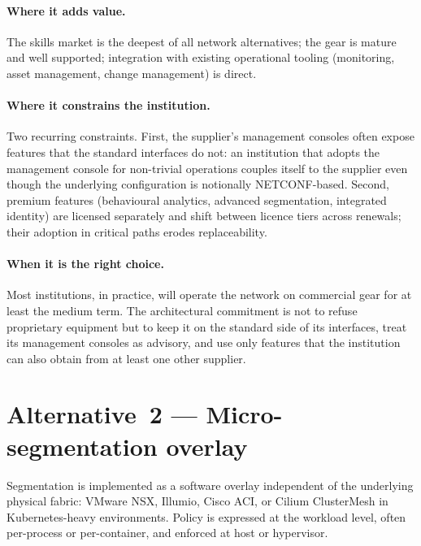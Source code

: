 \paragraph{Where it adds value.} The skills market is the deepest of
all network alternatives; the gear is mature and well supported;
integration with existing operational tooling (monitoring, asset
management, change management) is direct.

\paragraph{Where it constrains the institution.} Two recurring
constraints. First, the supplier's management consoles often expose
features that the standard interfaces do not: an institution that
adopts the management console for non-trivial operations couples
itself to the supplier even though the underlying configuration is
notionally NETCONF-based. Second, premium features (behavioural
analytics, advanced segmentation, integrated identity) are licensed
separately and shift between licence tiers across renewals; their
adoption in critical paths erodes replaceability.

\paragraph{When it is the right choice.} Most institutions, in
practice, will operate the network on commercial gear for at least
the medium term. The architectural commitment is not to refuse
proprietary equipment but to keep it on the standard side of its
interfaces, treat its management consoles as advisory, and use only
features that the institution can also obtain from at least one
other supplier.

\section{Alternative~2 --- Micro-segmentation overlay}
\label{sec:nw-alt2}

\begin{alternativebox}
\noindent Segmentation is implemented as a software overlay
independent of the underlying physical fabric: VMware NSX, Illumio,
Cisco ACI, or Cilium ClusterMesh in Kubernetes-heavy environments.
Policy is expressed at the workload level, often per-process or
per-container, and enforced at host or hypervisor.
\end{alternativebox}

